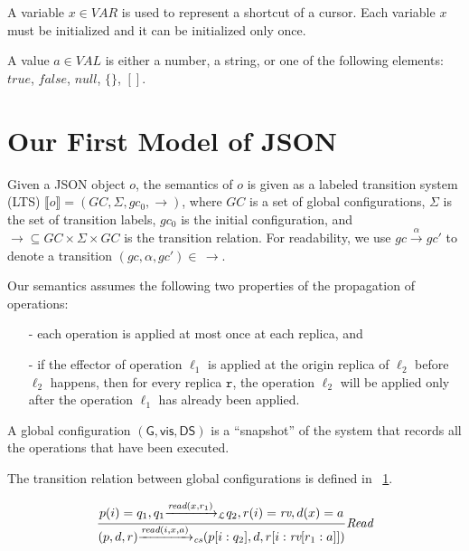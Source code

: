 A variable $x \in VAR$ is used to represent a shortcut of a cursor. Each variable $x$ must be initialized and it can be initialized only once.

A value $a \in VAL$ is either a number, a string, or one of the following elements: $\mathit{true}$, $\mathit{false}$, $\mathit{null}$, $\{ \}$, $[ ]$.




\section{Our First Model of JSON}
\label{sec:our first model of json} 

Given a JSON object $o$, the semantics of $o$ is given as a labeled transition system (LTS) $\llbracket o \rrbracket = (GC,\Sigma,gc_0,\rightarrow)$, where $GC$ is a set of global configurations, $\Sigma$ is the set of transition labels, $gc_0$ is the initial configuration, and $\rightarrow \subseteq GC \times \Sigma \times GC$ is the transition relation. For readability, we use $gc \xrightarrow{\alpha} gc'$ to denote a transition $(gc,\alpha,gc')\in\,\rightarrow$. 

Our semantics assumes the following two properties of the propagation of operations: 

\begin{itemize}
\setlength{\itemsep}{0.5pt}
\item[-] each operation is applied at most once at each replica, and 

\item[-] if the effector of operation $\ell_1$ is applied at the origin replica of $\ell_2$ before $\ell_2$ happens, then for every replica $\mathtt{r}$, the operation $\ell_2$ will be applied only after the operation $\ell_1$ has already been applied. 
\end{itemize} 

A global configuration $(\mathsf{G}, \mathsf{vis}, \mathsf{DS})$ is a
``snapshot'' of the system that records all the operations that have
been executed. 



The transition relation between global configurations is defined in \figureautorefname~\ref{fig:crdt-opsem}.

\begin{figure}
\[
\begin{array}{l c}
\bigfrac{p(i)=q_1, q_1
{\xrightarrow{\textit{read}(x,r_1)}}_{\mathcal{L}}
q_2,r(i)=\textit{rv},d(x)=a } {(p,d,r)
{\xrightarrow{\textit{read}(i,x,a)}}_{\textit{cs}}
(p[i:q_2],d,r[ i:\textit{rv}[r_1:a] ])} {\textit{Read}}
\end{array}
\]
\label{fig:crdt-opsem}
\vspace{-5mm}
\end{figure}
